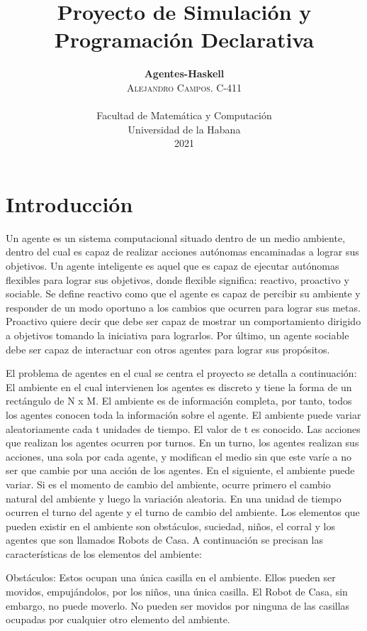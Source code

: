 \documentclass[twoside]{article}
\title{\vspace{-15mm}\fontsize{20pt}{10pt}\selectfont\textbf{Proyecto de Simulaci\'on y Programaci\'on Declarativa}}
\author{
\large
\textbf{\large Agentes-Haskell} \\[1.5cm]
\textsc{Alejandro Campos. C-411}\\\\[2mm]
\normalsize Facultad de Matem\'atica y Computaci\'on \\
\normalsize Universidad de la Habana \\
\normalsize 2021 \\[2cm]
\vspace{-5mm}
}
\date{}
\begin{document}
\maketitle

\thispagestyle{fancy} 


\section{Introducci\'on}
Un agente es un sistema computacional situado dentro de un medio ambiente, dentro del cual es capaz de realizar acciones aut\'onomas encaminadas a lograr sus objetivos. Un agente inteligente es aquel que es capaz de ejecutar aut\'onomas flexibles para lograr sus objetivos, donde flexible significa: reactivo, proactivo y sociable. Se define reactivo como que el agente es capaz de percibir su ambiente y responder de un modo oportuno a los cambios que ocurren para lograr sus metas. Proactivo quiere decir que debe ser capaz de mostrar un comportamiento dirigido a objetivos tomando la iniciativa para lograrlos. Por \'ultimo, un agente sociable debe ser capaz de interactuar con otros agentes para lograr sus prop\'ositos. 

El problema de agentes en el cual se centra el proyecto se detalla a continuaci\'on:\\

El ambiente en el cual intervienen los agentes es discreto y tiene la forma de un rect\'angulo de N x M. El ambiente es de informaci\'on completa, por tanto, todos los agentes conocen toda la informaci\'on sobre el agente. El ambiente puede variar aleatoriamente cada t unidades de tiempo. El valor de t es conocido. Las acciones que realizan los agentes ocurren por turnos. En un turno, los agentes realizan sus acciones, una sola por cada agente, y modifican el medio sin que este var\'ie a no ser que cambie por una acci\'on de los agentes. En el siguiente, el ambiente puede variar. Si es el momento de cambio del ambiente, ocurre primero el cambio natural del ambiente y luego la variaci\'on aleatoria. En una unidad de tiempo ocurren el turno del agente y el turno de cambio del ambiente. Los elementos que pueden existir en el ambiente son obst\'aculos, suciedad, ni\~nos, el corral y los agentes que son llamados Robots de Casa. A continuaci\'on se precisan las caracter\'isticas de los elementos del ambiente:

Obst\'aculos: Estos ocupan una \'unica casilla en el ambiente. Ellos pueden ser movidos, empuj\'andolos, por los ni\~nos, una \'unica casilla. El Robot de Casa, sin embargo, no puede moverlo. No pueden ser movidos por ninguna de las casillas ocupadas por cualquier otro elemento del ambiente.
\end{document}
